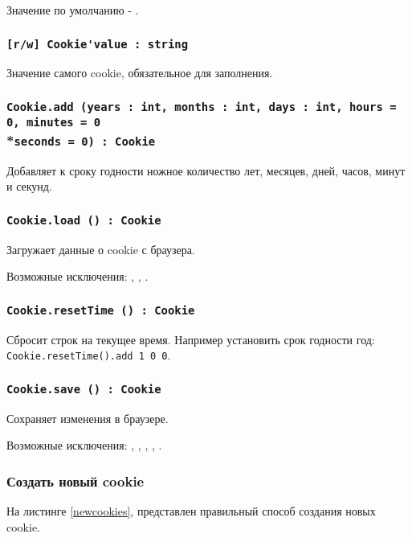 Значение по умолчанию - \false.

\subsubsection{\lstinline|[r/w] Cookie'value : string|}

Значение самого cookie, обязательное для заполнения.

\subsubsection{\lstinline|Cookie.add (years : int, months : int, days : int, hours = 0, minutes = 0|\\*\noindent\lstinline|seconds = 0) : Cookie|}

Добавляет к сроку годности ножное количество лет, месяцев, дней, часов, минут и секунд.

\subsubsection{\lstinline|Cookie.load () : Cookie|}

Загружает данные о cookie с браузера.

Возможные исключения: , , .

\subsubsection{\lstinline|Cookie.resetTime () : Cookie|}

Сбросит строк на текущее время. Например установить срок годности год: \lstinline|Cookie.resetTime().add 1 0 0|.

\subsubsection{\lstinline|Cookie.save () : Cookie|}

Сохраняет изменения в браузере.

Возможные исключения: , , , , .

\subsubsection{Создать новый cookie}

На листинге \ref{newcookies}, представлен правильный способ создания новых cookie.

